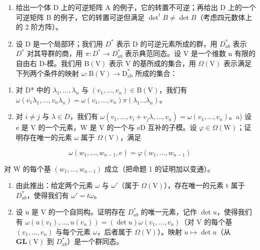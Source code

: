 
\begin{enumerate}
\def\labelenumi{\arabic{enumi})}
\item
  给出一个体 D 上的可逆矩阵 A 的例子，它的转置不可逆；再给出 D 上的一个可逆矩阵 B 的例子，它的转置可逆但满足 \(\det^{t}B \neq \det B\)（考虑四元数体上的 2 阶方阵）。
\item
  设 D 是一个局部环；我们用 \(D^{*}\) 表示 D 的可逆元素所成的群，用 \(D_{ab}^{*}\) 表示 \(D^{*}\) 对其导群的商，用 \(\pi : D^{*} \to D_{ab}^{*}\) 表示典范同态。设 V 是一个维数 n 有限的自由右 D-模。我们用 \(\mathrm{B(V)}\) 表示 V 的基所成的集合，用 \(\Omega(\mathrm{V})\) 表示满足下列两个条件的映射 \(\omega : \mathrm{B(V)} \to \mathrm{D}_{\mathrm{ab}}^{*}\) 所成的集合：
\end{enumerate}

\begin{enumerate}
\def\labelenumi{(\roman{enumi})}
\item
  对 D* 中的 \(\lambda_1, \ldots, \lambda_n\) 与 \((v_1, \ldots, v_n) \in \mathrm{B}(\mathrm{V})\)，我们有 \(\omega(v_1 \lambda_1, \ldots, v_n \lambda_n) = \omega(v_1, \ldots, v_n)\pi(\lambda_1 \ldots \lambda_n)\)。
\item
  对 \(i \neq j\) 与 \(\lambda \in D\)，我们有 \(\omega(v_{1},\ldots,v_{i}+v_{j}\lambda,\ldots,v_{n}) = \omega(v_{1},\ldots,v_{n})\)。a) 设 e 是 V 的一个元素，W 是 V 的一个与 eD 互补的子模。设 \(\varphi \in \Omega(\mathrm{W})\)；证明存在唯一的元素 \(\omega\) 属于 \(\Omega(\mathrm{V})\)，满足
\end{enumerate}

\[
\omega (w _ {1}, \dots , w _ {n - 1}, e) = \varphi (w _ {1}, \dots , w _ {n - 1})
\]

对 W 的每个基 \((w_{1},\ldots ,w_{n - 1})\) 成立（把命题 1 的证明加以变通）。

\begin{enumerate}
\def\labelenumi{\alph{enumi})}
\setcounter{enumi}{1}
\item
  由此推出：给定两个元素 \(\omega\) 与 \(\omega'\)（属于 \(\Omega(\mathrm{V})\)），存在唯一的元素 t 属于 \(D_{ab}^{*}\)，使得我们有 \(\omega' = t\omega\)。
\item
  设 u 是 V 的一个自同构。证明存在 \(D_{ab}^{*}\) 的唯一元素，记作 \(\det u\)，使得我们有 \(\omega(u(v_{1}),\ldots,u(v_{n}))=(\det u)\omega(v_{1},\ldots,v_{n})\)（对 V 的每个基 \((v_{1},\ldots,v_{n})\) 与每个元素 \(\omega\)，后者属于 \(\Omega(\mathrm{V})\)）。映射 \(u\mapsto\det u\)（从 \(\mathbf{GL}(\mathrm{V})\) 到 \(D_{ab}^{*}\)）是一个群同态。
\end{enumerate}

